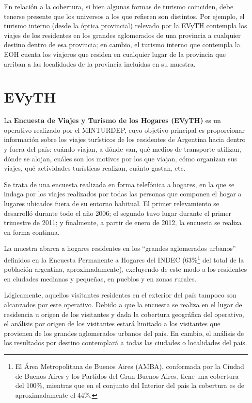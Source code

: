 \documentclass[
]{book}
\begin{document}
En relación a la cobertura, si bien algunas formas de turismo coinciden, debe tenerse presente que los universos a los que refieren son distintos.
Por ejemplo, el turismo interno (desde la óptica provincial) relevado por la EVyTH contempla los viajes de los residentes en los grandes aglomerados de una provincia a cualquier destino dentro de esa provincia; en cambio, el turismo interno que contempla la EOH cuenta los viajeros que residen en cualquier lugar de la provincia que arriban a las localidades de la provincia incluidas en su muestra.

\hypertarget{evyth}{%
\section{EVyTH}\label{evyth}}

La \textbf{Encuesta de Viajes y Turismo de los Hogares (EVyTH)} es un operativo realizado por el MINTURDEP, cuyo objetivo principal es proporcionar información sobre los viajes turísticos de los residentes de Argentina hacia dentro y fuera del país: cuándo viajan, a dónde van, qué medios de transporte utilizan, dónde se alojan, cuáles son los motivos por los que viajan, cómo organizan sus viajes, qué actividades turísticas realizan, cuánto gastan, etc.

Se trata de una encuesta realizada en forma telefónica a hogares, en la que se indaga por los viajes realizados por todas las personas que componen el hogar a lugares ubicados fuera de su entorno habitual.
El primer relevamiento se desarrolló durante todo el año 2006; el segundo tuvo lugar durante el primer trimestre de 2011; y finalmente, a partir de enero de 2012, la encuesta se realiza en forma continua.

La muestra abarca a hogares residentes en los ``grandes aglomerados urbanos'' definidos en la Encuesta Permanente a Hogares del INDEC (63\%\footnote{El Área Metropolitana de Buenos Aires (AMBA), conformada por la Ciudad de Buenos Aires y los Partidos del Gran Buenos Aires, tiene una cobertura del 100\%, mientras que en el conjunto del Interior del país la cobertura es de aproximadamente el 44\%.} del total de la población argentina, aproximadamente), excluyendo de este modo a los residentes en ciudades medianas y pequeñas, en pueblos y en zonas rurales.

Lógicamente, aquellos visitantes residentes en el exterior del país tampoco son alcanzados por este operativo.
Debido a que la encuesta se realiza en el lugar de residencia u origen de los visitantes y dada la cobertura geográfica del operativo, el análisis por origen de los visitantes estará limitado a los visitantes que provienen de los grandes aglomerados urbanos del país.
En cambio, el análisis de los resultados por destino contemplará a todas las ciudades o localidades del país.
\end{document}
